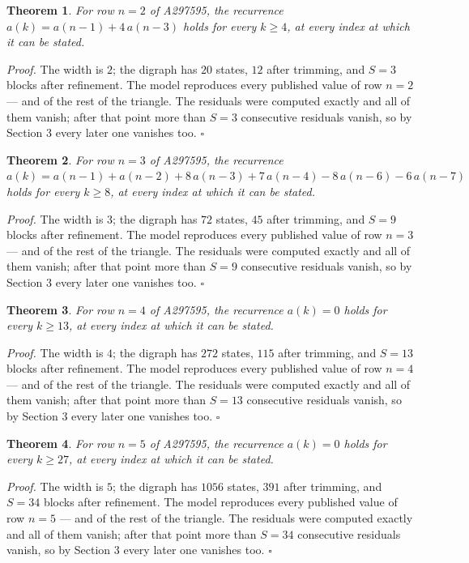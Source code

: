 \documentclass[11pt]{article}
\newtheorem{theorem}{Theorem}
\theoremstyle{definition}
\begin{document}
\begin{theorem} For row $n = 2$ of A297595, the recurrence $a(k) = a(n-1) + 4\,a(n-3)$ holds for every $k \ge 4$, at every index at which it can be stated.\end{theorem}

{\itshape Proof.} The width is $2$; the digraph has $20$ states, $12$ after trimming, and $S = 3$ blocks after refinement. The model reproduces every published value of row $n = 2$ --- and of the rest of the triangle. The residuals were computed exactly and all of them vanish; after that point more than $S = 3$ consecutive residuals vanish, so by Section 3 every later one vanishes too. $\square$

\begin{theorem} For row $n = 3$ of A297595, the recurrence $a(k) = a(n-1) + a(n-2) + 8\,a(n-3) + 7\,a(n-4) - 8\,a(n-6) - 6\,a(n-7)$ holds for every $k \ge 8$, at every index at which it can be stated.\end{theorem}

{\itshape Proof.} The width is $3$; the digraph has $72$ states, $45$ after trimming, and $S = 9$ blocks after refinement. The model reproduces every published value of row $n = 3$ --- and of the rest of the triangle. The residuals were computed exactly and all of them vanish; after that point more than $S = 9$ consecutive residuals vanish, so by Section 3 every later one vanishes too. $\square$

\begin{theorem} For row $n = 4$ of A297595, the recurrence $a(k) = 0$ holds for every $k \ge 13$, at every index at which it can be stated.\end{theorem}

{\itshape Proof.} The width is $4$; the digraph has $272$ states, $115$ after trimming, and $S = 13$ blocks after refinement. The model reproduces every published value of row $n = 4$ --- and of the rest of the triangle. The residuals were computed exactly and all of them vanish; after that point more than $S = 13$ consecutive residuals vanish, so by Section 3 every later one vanishes too. $\square$

\begin{theorem} For row $n = 5$ of A297595, the recurrence $a(k) = 0$ holds for every $k \ge 27$, at every index at which it can be stated.\end{theorem}

{\itshape Proof.} The width is $5$; the digraph has $1056$ states, $391$ after trimming, and $S = 34$ blocks after refinement. The model reproduces every published value of row $n = 5$ --- and of the rest of the triangle. The residuals were computed exactly and all of them vanish; after that point more than $S = 34$ consecutive residuals vanish, so by Section 3 every later one vanishes too. $\square$
\end{document}
